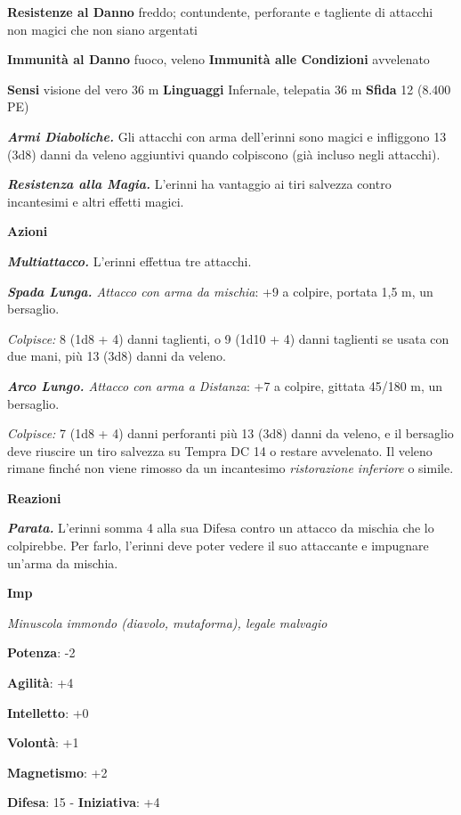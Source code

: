 \begin{multicols}{2}
\textbf{Resistenze al Danno} freddo; contundente, perforante e tagliente
di attacchi non magici che non siano argentati

\textbf{Immunità al Danno} fuoco, veleno \textbf{Immunità alle
Condizioni} avvelenato

\textbf{Sensi} visione del vero 36 m
\textbf{Linguaggi} Infernale, telepatia 36 m \textbf{Sfida} 12 (8.400
PE)

\emph{\textbf{Armi Diaboliche.}} Gli attacchi con arma dell'erinni sono
magici e infliggono 13 (3d8) danni da veleno aggiuntivi quando
colpiscono (già incluso negli attacchi).

\emph{\textbf{Resistenza alla Magia.}} L'erinni ha vantaggio ai tiri
salvezza contro incantesimi e altri effetti magici.

\textbf{Azioni}

\emph{\textbf{Multiattacco.}} L'erinni effettua tre attacchi.

\emph{\textbf{Spada Lunga.} Attacco con arma da mischia}: +9 a colpire,
portata 1,5 m, un bersaglio.

\emph{Colpisce:} 8 (1d8 + 4) danni taglienti, o 9 (1d10 + 4) danni
taglienti se usata con due mani, più 13 (3d8) danni da veleno.

\emph{\textbf{Arco Lungo.} Attacco con arma a Distanza}: +7 a colpire,
gittata 45/180 m, un bersaglio.

\emph{Colpisce:} 7 (1d8 + 4) danni perforanti più 13 (3d8) danni da
veleno, e il bersaglio deve riuscire un tiro salvezza su Tempra DC
14 o restare avvelenato. Il veleno rimane finché non viene rimosso da un
incantesimo \emph{ristorazione inferiore} o simile.

\textbf{Reazioni}

\emph{\textbf{Parata.}} L'erinni somma 4 alla sua Difesa contro un attacco
da mischia che lo colpirebbe. Per farlo, l'erinni deve poter vedere il
suo attaccante e impugnare un'arma da mischia.



\textbf{Imp}

\emph{Minuscola immondo (diavolo, mutaforma), legale malvagio}

\textbf{Potenza}: -2

\textbf{Agilità}: +4

\textbf{Intelletto}: +0

\textbf{Volontà}: +1

\textbf{Magnetismo}: +2

\textbf{Difesa}: 15 - \textbf{Iniziativa}: +4


\end{multicols}
